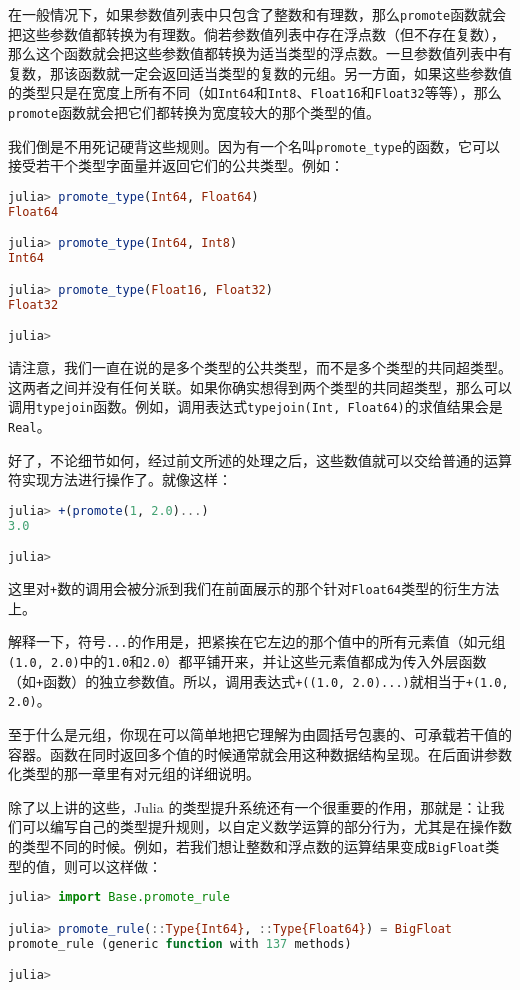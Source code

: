 在一般情况下，如果参数值列表中只包含了整数和有理数，那么\verb`promote`函数就会把这些参数值都转换为有理数。倘若参数值列表中存在浮点数（但不存在复数），那么这个函数就会把这些参数值都转换为适当类型的浮点数。一旦参数值列表中有复数，那该函数就一定会返回适当类型的复数的元组。另一方面，如果这些参数值的类型只是在宽度上所有不同（如\verb`Int64`和\verb`Int8`、\verb`Float16`和\verb`Float32`等等），那么\verb`promote`函数就会把它们都转换为宽度较大的那个类型的值。

我们倒是不用死记硬背这些规则。因为有一个名叫\verb`promote_type`的函数，它可以接受若干个类型字面量并返回它们的公共类型。例如：
\begin{lstlisting}[language=julia]
julia> promote_type(Int64, Float64)
Float64

julia> promote_type(Int64, Int8)
Int64

julia> promote_type(Float16, Float32)
Float32

julia> 
\end{lstlisting}

请注意，我们一直在说的是多个类型的公共类型，而不是多个类型的共同超类型。这两者之间并没有任何关联。如果你确实想得到两个类型的共同超类型，那么可以调用\verb`typejoin`函数。例如，调用表达式\verb`typejoin(Int, Float64)`的求值结果会是\verb`Real`。

好了，不论细节如何，经过前文所述的处理之后，这些数值就可以交给普通的运算符实现方法进行操作了。就像这样：
\begin{lstlisting}[language=julia]
julia> +(promote(1, 2.0)...)
3.0

julia> 
\end{lstlisting}

这里对\verb`+`数的调用会被分派到我们在前面展示的那个针对\verb`Float64`类型的衍生方法上。

解释一下，符号\verb`...`的作用是，把紧挨在它左边的那个值中的所有元素值（如元组\verb`(1.0, 2.0)`中的\verb`1.0`和\verb`2.0`）都平铺开来，并让这些元素值都成为传入外层函数（如\verb`+`函数）的独立参数值。所以，调用表达式\verb`+((1.0, 2.0)...)`就相当于\verb`+(1.0, 2.0)`。

至于什么是元组，你现在可以简单地把它理解为由圆括号包裹的、可承载若干值的容器。函数在同时返回多个值的时候通常就会用这种数据结构呈现。在后面讲参数化类型的那一章里有对元组的详细说明。

除了以上讲的这些，Julia 的类型提升系统还有一个很重要的作用，那就是：让我们可以编写自己的类型提升规则，以自定义数学运算的部分行为，尤其是在操作数的类型不同的时候。例如，若我们想让整数和浮点数的运算结果变成\verb`BigFloat`类型的值，则可以这样做：
\begin{lstlisting}[language=julia]
julia> import Base.promote_rule

julia> promote_rule(::Type{Int64}, ::Type{Float64}) = BigFloat
promote_rule (generic function with 137 methods)

julia>
\end{lstlisting}

